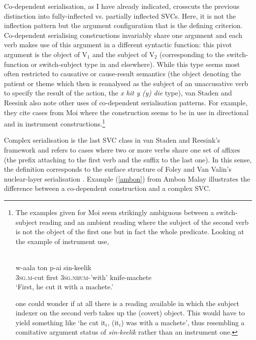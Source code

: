 Co-dependent serialisation, as I have already indicated, crosscuts the previous distinction into fully-inflected vs. partially inflected SVCs. Here, it is not the inflection pattern but the argument configuration that is the defining criterion. Co-dependent serialising constructions invariably share one argument and each verb makes use of this argument in a different syntactic function: this pivot argument is the object of V$_1$ and the subject of V$_2$ (corresponding to the switch-function or switch-subject type in \citealt{Aikhenvald2006} and elsewhere). While this type seems most often restricted to causative or cause-result semantics (the object denoting the patient or theme which then is reanalysed as the subject of an unaccusative verb to specify the result of the action, the \textit{x hit y (y) die} type), van Staden and Reesink also note other uses of co-dependent serialisation patterns. For example, they cite cases from Moi where the construction seems to be in use in directional and in instrument constructions.\footnote{The examples given for Moi seem strikingly ambiguous between a switch-subject reading and an ambient reading where the subject of the second verb is not the object of the first one but in fact the whole predicate. Looking at the example of instrument use,

\ea \label{}
\\
\gll w-aala ton p-ai sin-keelik \\
\textsc{3}\textsc{sg}.\textsc{m}-cut first \textsc{3}\textsc{sg}.\textsc{nhum}-'with' knife-machete \\
\glft `First, he cut it with a machete.'\\ 
\z

one could wonder if at all there is a reading available in which the subject indexer on the second verb takes up the (covert) object. This would have to yield something like `he cut it$_i$, (it$_i$) was with a machete', thus resembling a comitative argument status of \textit{sin-keelik} rather than an instrument one.}

Complex serialisation is the last SVC class in van Staden and Reesink's framework and refers to cases where two or more verbs share one set of affixes (the prefix attaching to the first verb and the suffix to the last one). In this sense, the definition corresponds to the surface structure of Foley and Van Valin's \citep{foley1984functional} nuclear-layer serialisation \citep[26]{vanstaden2008serial}. Example (\ref{ambon}) from Ambon Malay illustrates the difference between a co-dependent construction and a complex SVC.

